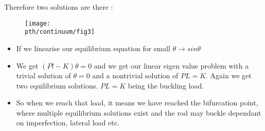 	\begin{frame}
		Therefore two solutions  are there :
		\begin{figure}
			\centering
			\texttt{[image: \\pth/continuum/fig3]}
			\label{fig:fig3}
		\end{figure}
		\begin{itemize}
			\item If we linearise our equilibrium equation for small $\theta \rightarrow sin \theta$
			\item We get $(Pl - K)\theta = 0$ and we get our linear eigen value problem with a trivial solution of $\theta = 0$ and a nontrivial solution of $PL = K$. Again we get two equilibrium solutions. $PL = K$ being the buckling load. 
			\item So when we reach that load, it means we have reached the bifurcation point, where multiple equilibrium solutions exist and the rod may buckle dependant on imperfection, lateral load etc. 			
		\end{itemize}
	\end{frame}
